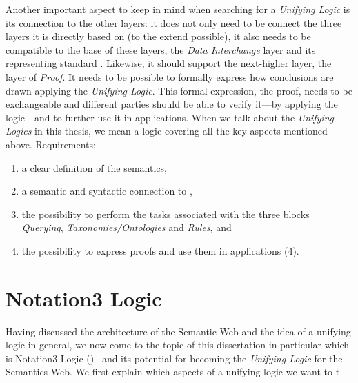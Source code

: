 Another important aspect to keep in mind when searching for a \emph{Unifying Logic} is its connection to the other layers: it does not only need to be 
connect the three layers it is directly based on (to the extend possible), 
it also needs to be compatible to the base of these layers, the \emph{Data Interchange} layer and its representing standard \rdf. Likewise, it should support
the next-higher layer, the layer of 
\emph{Proof}. It needs to be possible to formally express how conclusions are drawn applying the \emph{Unifying Logic}. This formal expression, the proof, needs to be exchangeable 
and different parties should be able to verify it---by applying the logic---and to further use it in applications. 
When we talk about the \emph{Unifying Logics} in this thesis, we mean a logic covering all the key aspects mentioned above.
Requirements:
\begin{enumerate}
\item a clear definition of the semantics,
\item a semantic and syntactic connection to \rdf, 
\item the possibility to perform the tasks associated with 
the three blocks \emph{Querying}, \emph{Taxonomies/Ontologies}
and \emph{Rules}, and 
\item the possibility to express proofs and use them in applications (4).
\end{enumerate}


\section{Notation3 Logic}
Having discussed the architecture of the Semantic Web and the idea of a unifying logic in general, 
we now come to the topic of this dissertation in particular which  is 
Notation3 Logic (\nthreelogic)~\cite{N3Logic} and its potential for becoming the \emph{Unifying Logic} for the Semantics Web. 
We first explain which aspects of a unifying logic we want to t

